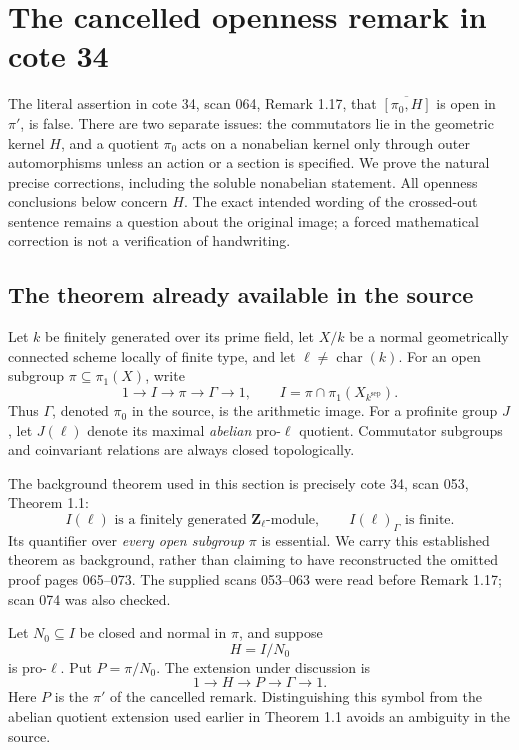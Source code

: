 \section{The cancelled openness remark in cote 34}
\label{sec:q03}

The literal assertion in cote 34, scan 064, Remark 1.17, that
\(\overline{[\pi_0,H]}\) is open in \(\pi'\), is false.
There are two separate issues: the commutators lie in the geometric
kernel \(H\), and a quotient \(\pi_0\) acts on a nonabelian kernel only
through outer automorphisms unless an action or a section is specified.
We prove the natural precise corrections, including the soluble
nonabelian statement.  All openness conclusions below concern \(H\).
The exact intended wording of the crossed-out sentence remains a
question about the original image; a forced mathematical correction is
not a verification of handwriting.

\subsection{The theorem already available in the source}

Let \(k\) be finitely generated over its prime field, let \(X/k\) be a
normal geometrically connected scheme locally of finite type, and let
\(\ell\ne\operatorname{char}(k)\).  For an open subgroup
\(\pi\subseteq\pi_1(X)\), write
\[
1\longrightarrow I\longrightarrow\pi\longrightarrow\Gamma
\longrightarrow1,
\qquad
I=\pi\cap\pi_1(X_{k^{\mathrm{sep}}}).
\]
Thus \(\Gamma\), denoted \(\pi_0\) in the source, is the arithmetic
image.  For a profinite group \(J\), let \(J(\ell)\) denote its maximal
\emph{abelian} pro-\(\ell\) quotient.  Commutator subgroups and
coinvariant relations are always closed topologically.

The background theorem used in this section is precisely cote 34,
scan 053, Theorem 1.1:
\[
 I(\ell)\text{ is a finitely generated }\mathbf Z_\ell\text{-module},
 \qquad I(\ell)_\Gamma\text{ is finite}.
 \tag{Q3-B01}
\]
Its quantifier over \emph{every open subgroup} \(\pi\) is essential.
We carry this established theorem as background, rather than claiming
to have reconstructed the omitted proof pages 065--073.  The supplied
scans 053--063 were read before Remark 1.17; scan 074 was also checked.

Let \(N_0\subseteq I\) be closed and normal in \(\pi\), and suppose
\[
H=I/N_0
\]
is pro-\(\ell\).  Put \(P=\pi/N_0\).  The extension under discussion is
\[
1\longrightarrow H\longrightarrow P\longrightarrow\Gamma
\longrightarrow1. \tag{Q3-E}
\]
Here \(P\) is the \(\pi'\) of the cancelled remark.  Distinguishing this
symbol from the abelian quotient extension used earlier in Theorem 1.1
avoids an ambiguity in the source.

